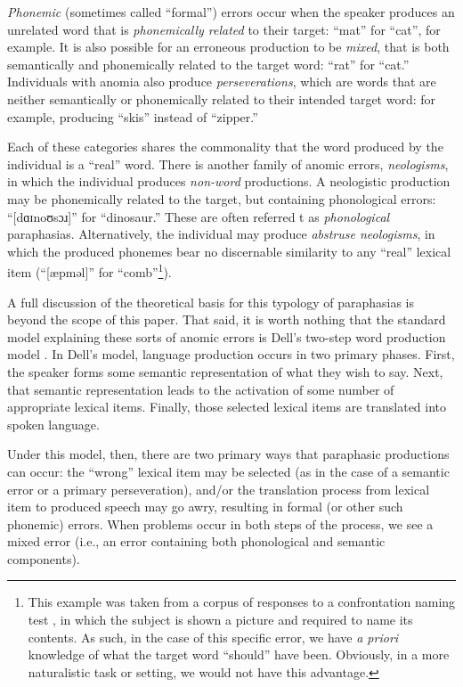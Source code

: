 \documentclass[11pt,letterpaper]{article}
\begin{document}
\emph{Phonemic} (sometimes called ``formal'') errors occur when the speaker produces an unrelated word that is \emph{phonemically related} to their target: ``mat'' for ``cat'', for example.
It is also possible for an erroneous production to be \emph{mixed}, that is both semantically and phonemically related to the target word: ``rat'' for ``cat.''
Individuals with anomia also produce \emph{perseverations}, which are words that are neither semantically or phonemically related to their intended target word: for example, producing ``skis'' instead of ``zipper.''

Each of these categories shares the commonality that the word produced by the individual is a ``real'' word. There is another family of anomic errors, \emph{neologisms}, in which the individual produces \emph{non-word} productions.
A neologistic production may be phonemically related to the target, but containing phonological errors: ``[dɑɪnoʊsɔɹ]'' for ``dinosaur.''
These are often referred t as \emph{phonological} paraphasias.
Alternatively, the individual may produce \emph{abstruse neologisms}, in which the produced phonemes bear no discernable similarity to any ``real'' lexical item (``[æpməl]'' for ``comb''\footnote{This example was taken from a corpus of responses to a confrontation naming test \cite{Mirman:2010cd}, in which the subject is shown a picture and required to name its contents. As such, in the case of this specific error, we have \emph{a priori} knowledge of what the target word ``should'' have been. Obviously, in a more naturalistic task or setting, we would not have this advantage.}).

A full discussion of the theoretical basis for this typology of paraphasias is beyond the scope of this paper.
That said, it is worth nothing that the standard model explaining these sorts of anomic errors is Dell's two-step word production model \cite{Dell:1997wj,Dell:1986vk}.
In Dell's model, language production occurs in two primary phases.
First, the speaker forms some semantic representation of what they wish to say.
Next, that semantic representation leads to the activation of some number of appropriate lexical items.
Finally, those selected lexical items are translated into spoken language.

Under this model, then, there are two primary ways that paraphasic productions can occur: the ``wrong'' lexical item may be selected (as in the case of a semantic error or a primary perseveration), and/or the translation process from lexical item to produced speech may go awry, resulting in formal (or other such phonemic) errors.
When problems occur in both steps of the process, we see a mixed error (i.e., an error containing both phonological and semantic components).
\end{document}
